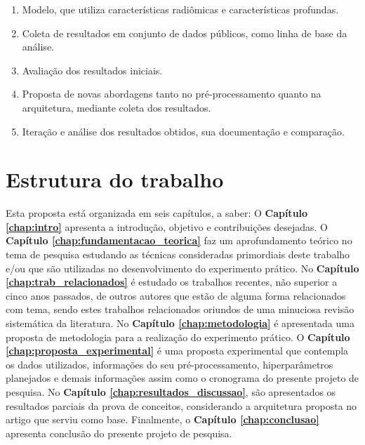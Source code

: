 \begin{enumerate}

\item Modelo, que utiliza características radiômicas e
características profundas.

\item Coleta de resultados em conjunto de dados públicos, como linha de base da análise.

\item Avaliação dos resultados iniciais.

\item Proposta de novas abordagens tanto no pré-processamento quanto na arquitetura, mediante coleta dos resultados.

\item Iteração e análise dos resultados obtidos, sua documentação e comparação.
\end{enumerate}

\section{Estrutura do trabalho}
\label{sec:cap1_estrutura_trabalho}

Esta proposta está organizada em seis capítulos, a saber:
O \textbf{Capítulo \ref{chap:intro}} apresenta a introdução, objetivo e contribuições desejadas. O \textbf{Capítulo \ref{chap:fundamentacao_teorica}} faz um aprofundamento teórico no tema de pesquisa estudando as técnicas consideradas primordiais deste trabalho e/ou que são utilizadas no desenvolvimento do experimento prático. No \textbf{Capítulo \ref{chap:trab_relacionados}} é estudado  os trabalhos recentes, não superior a cinco anos passados, de outros autores que estão de alguma forma relacionados com tema, sendo estes trabalhos relacionados oriundos de uma minuciosa revisão sistemática da literatura. No \textbf{Capítulo \ref{chap:metodologia}} é apresentada uma proposta de metodologia para a realização do experimento prático. O \textbf{Capítulo \ref{chap:proposta_experimental}} é uma proposta experimental que contempla os dados utilizados, informações do seu pré-processamento, hiperparâmetros planejados e demais informações assim como o cronograma do presente projeto de pesquisa. No \textbf{Capítulo \ref{chap:resultados_discussao}}, são apresentados os resultados parciais da prova de conceitos, considerando a arquitetura proposta no artigo que serviu como base. Finalmente, o \textbf{Capítulo \ref{chap:conclusao}} apresenta conclusão do presente projeto de pesquisa.
